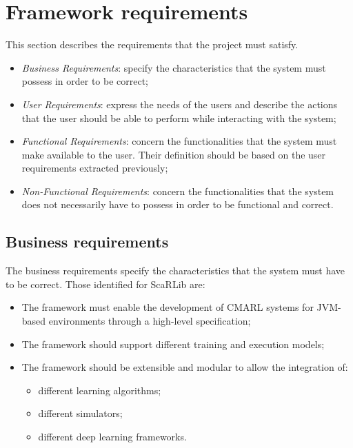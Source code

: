 \documentclass[12pt,a4paper,openright,twoside]{book}
\begin{document}


\section{Framework requirements}
This section describes the requirements that the project must satisfy. 
\begin{itemize}
    \item \emph{Business Requirements}: specify the characteristics that the system must possess in order to be correct;
    \item \emph{User Requirements}: express the needs of the users and describe the actions that the user should be able 
        to perform while interacting with the system;
    \item \emph{Functional Requirements}: concern the functionalities that the system must make available to the user. 
        Their definition should be based on the user requirements extracted previously;
    \item \emph{Non-Functional Requirements}: concern the functionalities that the system does not necessarily have 
        to possess in order to be functional and correct.

\end{itemize}

\subsection*{Business requirements}
The business requirements specify the characteristics that the system must have to be correct. Those identified for ScaRLib are:
\begin{itemize}
    \item The framework must enable the development of CMARL systems for JVM-based environments 
        through a high-level specification;
    \item The framework should support different training and execution models;
    \item The framework should be extensible and modular to allow  the integration of:
    \begin{itemize}
        \item different learning algorithms;
        \item different simulators;
        \item different deep learning frameworks.
    \end{itemize}
\end{itemize}
\end{document}

